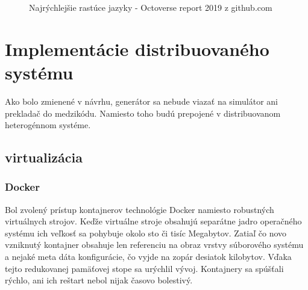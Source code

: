\begin{figure} [H]
	\label{chart:githubgrow}
	\centering
{} 
\caption{Najrýchlejšie rastúce jazyky - Octoverse report 2019 z github.com \cite{githuboctoverse}}
\end{figure}

\section{Implementácie distribuovaného systému}
Ako bolo zmienené v návrhu, generátor sa nebude viazať na simulátor ani prekladač do medzikódu. Namiesto toho budú prepojené v distribuovanom heterogénnom systéme.

\subsection{virtualizácia}

\subsubsection{Docker}
Bol zvolený prístup kontajnerov technológie Docker namiesto robustných virtuálnych strojov. Keďže virtuálne stroje obsahujú separátne jadro operačného systému ich veľkosť sa pohybuje okolo sto či tisíc Megabytov. Zatiaľ čo novo vzniknutý kontajner obsahuje len referenciu na obraz vrstvy súborového systému a nejaké meta dáta konfigurácie, čo vyjde na zopár desiatok kilobytov. \cite{kane2018docker} Vďaka tejto redukovanej pamäťovej stope sa urýchlil vývoj. Kontajnery sa spúšťali rýchlo, ani ich reštart nebol nijak časovo bolestivý.

